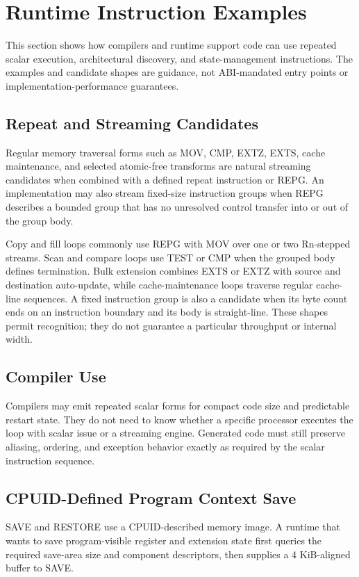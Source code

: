 \clearpage
\section{Runtime Instruction Examples}

This section shows how compilers and runtime support code can use repeated scalar execution, architectural discovery,
and state-management instructions. The examples and candidate shapes are guidance, not ABI-mandated entry points or
implementation-performance guarantees.

\subsection{Repeat and Streaming Candidates}
Regular memory traversal forms such as MOV, CMP, EXTZ, EXTS, cache maintenance, and selected atomic-free
transforms are natural streaming candidates when combined with a defined repeat instruction or REPG. An implementation may also stream
fixed-size instruction groups when REPG describes a bounded group that has no unresolved control transfer into or
out of the group body.

Copy and fill loops commonly use REPG with MOV over one or two Rn-stepped streams. Scan and compare loops use TEST or
CMP when the grouped body defines termination. Bulk extension combines EXTS or EXTZ with source and destination
auto-update, while cache-maintenance loops traverse regular cache-line sequences. A fixed instruction group is also a
candidate when its byte count ends on an instruction boundary and its body is straight-line. These shapes permit
recognition; they do not guarantee a particular throughput or internal width.

\subsection{Compiler Use}
Compilers may emit repeated scalar forms for compact code size and predictable restart state. They do not need to
know whether a specific processor executes the loop with scalar issue or a streaming engine. Generated code must
still preserve aliasing, ordering, and exception behavior exactly as required by the scalar instruction sequence.

\subsection{CPUID-Defined Program Context Save}
SAVE and RESTORE use a CPUID-described memory image. A runtime that wants to save program-visible register and
extension state first queries the required save-area size and component descriptors, then supplies a
4 KiB-aligned buffer to SAVE.


